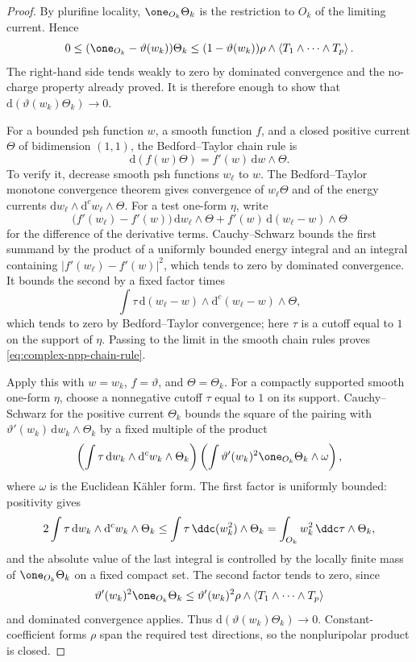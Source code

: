 \begin{proof}
By plurifine locality,
$\one_{O_k}\Theta_k$ is the restriction to $O_k$ of the limiting
current.  Hence
\[
 0\leq(\one_{O_k}-\vartheta(w_k))\Theta_k
 \leq(1-\vartheta(w_k))
       \rho\wedge\left\langle T_1\wedge\cdots\wedge T_p\right\rangle .
\]
The right-hand side tends weakly to zero by dominated convergence and the
no-charge property already proved.  It is therefore enough to show that
$\mathrm d(\vartheta(w_k)\Theta_k)\to0$.

For a bounded psh function $w$, a smooth function $f$, and a closed
positive current $\Theta$ of bidimension $(1,1)$, the Bedford--Taylor
chain rule is
\[
             \mathrm d(f(w)\Theta)=f'(w)\,\mathrm d w\wedge\Theta.
\tag{51.16d}\label{eq:complex-npp-chain-rule}
\]
To verify it, decrease smooth psh functions $w_\ell$ to $w$.  The
Bedford--Taylor monotone convergence theorem gives convergence of
$w_\ell\Theta$ and of the energy currents
$\mathrm d w_\ell\wedge\mathrm d^c w_\ell\wedge\Theta$.  For a test
one-form $\eta$, write
\[
 \bigl(f'(w_\ell)-f'(w)\bigr)\,\mathrm d w_\ell\wedge\Theta
 +f'(w)\,\mathrm d(w_\ell-w)\wedge\Theta
\]
for the difference of the derivative terms.  Cauchy--Schwarz bounds the
first summand by the product of a uniformly bounded energy integral and an
integral containing $\lvert f'(w_\ell)-f'(w)\rvert^2$, which tends to
zero by dominated convergence.  It bounds the second by a fixed factor
times
\[
 \int\tau\,\mathrm d(w_\ell-w)\wedge
                    \mathrm d^c(w_\ell-w)\wedge\Theta,
\]
which tends to zero by Bedford--Taylor convergence; here $\tau$ is a
cutoff equal to $1$ on the support of $\eta$.  Passing to the limit in
the smooth chain rules proves \eqref{eq:complex-npp-chain-rule}.

Apply this with $w=w_k$, $f=\vartheta$, and $\Theta=\Theta_k$.
For a compactly supported smooth one-form $\eta$, choose a nonnegative
cutoff $\tau$ equal to $1$ on its support.  Cauchy--Schwarz for the
positive current $\Theta_k$ bounds the square of the pairing with
$\vartheta'(w_k)\,\mathrm d w_k\wedge\Theta_k$ by a fixed multiple of
the product
\[
 \left(\int\tau\,\mathrm d w_k\wedge\mathrm d^c w_k\wedge\Theta_k\right)
 \left(\int\vartheta'(w_k)^2\one_{O_k}\Theta_k\wedge\omega\right),
\]
where $\omega$ is the Euclidean K\"ahler form.  The first factor is
uniformly bounded: positivity gives
\[
 2\int\tau\,\mathrm d w_k\wedge\mathrm d^c w_k\wedge\Theta_k
 \leq\int\tau\,\ddc(w_k^2)\wedge\Theta_k
 =\int_{O_k}w_k^2\,\ddc\tau\wedge\Theta_k,
\]
and the absolute value of the last integral is controlled by the locally
finite mass of $\one_{O_k}\Theta_k$ on a fixed compact set.  The second
factor tends to zero, since
\[
 \vartheta'(w_k)^2\one_{O_k}\Theta_k
 \leq \vartheta'(w_k)^2
       \rho\wedge\left\langle T_1\wedge\cdots\wedge T_p\right\rangle
\]
and dominated convergence applies.  Thus
$\mathrm d(\vartheta(w_k)\Theta_k)\to0$.  Constant-coefficient forms
$\rho$ span the required test directions, so the nonpluripolar product is
closed.


\end{proof}

